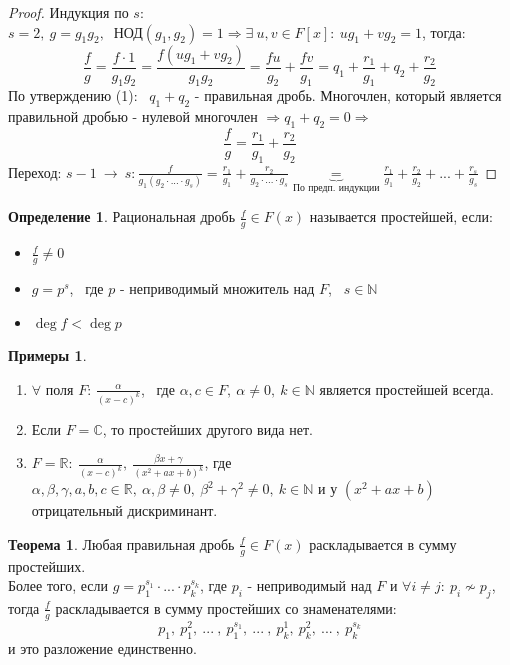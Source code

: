 \documentclass[a4paper, 12pt]{article}
\newcommand{\R}{\mathbb R}
\newcommand{\N}{\mathbb N}
\newcommand\tab[1][.5cm]{\hspace*{#1}}
\theoremstyle{definition}
\newtheorem*{definition}{Определение}
\newtheorem*{theorem}{Теорема}
\newtheorem*{example}{Примеры}
\begin{document}
  \begin{proof}
    Индукция по $s$:\\
    $s=2, \ g = g_1g_2, \ $ НОД$(g_1, g_2)=1 \Longrightarrow \exists \ u, v \in F[x]: \ ug_1 + vg_2 = 1$, тогда:
    $$\frac{f}{g} = \frac{f\cdot 1}{g_1g_2} = \frac{f(ug_1 + vg_2)}{g_1g_2} = \frac{fu}{g_2} + \frac{fv}{g_1} = q_1 + \frac{r_1}{g_1} + q_2 + \frac{r_2}{g_2}$$
    По утверждению (1): \ $q_1 + q_2$ - правильная дробь. Многочлен, который является правильной дробью - нулевой многочлен  $\Longrightarrow q_1 + q_2 = 0 \Longrightarrow$ 
    $$\frac{f}{g} =\frac{r_1}{g_1} + \frac{r_2}{g_2}$$
    Переход: $s-1 \ \to \ s: \frac{f}{g_1(g_2\cdot ... \cdot g_s)} = \frac{r_1}{g_1} + \frac{r_2}{g_2\cdot ... \cdot g_s} \underbrace{=}_{\text{По предп. индукции}} \frac{r_1}{g_1} + \frac{r_2}{g_2} + ... + \frac{r_s}{g_s}$
  \end{proof}
  \begin{definition}
    Рациональная дробь $\frac{f}{g}\in F(x)$ называется простейшей, если:
    \begin{itemize}
      \item[1) \ ] $\frac{f}{g} \neq 0$
      \item[2) \ ] $g = p^s$, \ где $p$ - неприводимый множитель над $F$, \ $s \in \N$
      \item[3) \ ] $\deg f < \deg p$ 
    \end{itemize}
  \end{definition}
  \begin{example}\tab
    \begin{enumerate}
      \item $\forall$ поля $F$: $\frac{\alpha}{(x-c)^k}$, \ где $\alpha, c \in F, \ \alpha\neq 0, \ k \in \N$ является простейшей всегда.
      \item Если $F = \mathbb{C}$, то простейших другого вида нет.
      \item $F = \R: \ \frac{\alpha}{(x-c)^k}, \ \frac{\beta x + \gamma}{(x^2+ax+b)^k}$, где $\alpha, \beta, \gamma, a, b, c \in \R, \ \alpha, \beta \neq 0, \ \beta^2 + \gamma^2\neq 0, \ k \in \N$ и у $(x^2+ax+b)$ отрицательный дискриминант.   
    \end{enumerate}
  \end{example}
  \begin{theorem}
    Любая правильная дробь $\frac{f}{g} \in F(x)$ раскладывается в сумму простейших.\\
    Более того, если $g = p_1^{s_1}\cdot ... \cdot p_k^{s_k}$, где $p_i$ - неприводимый над $F$ и $\forall i \neq j: \ p_i \not \sim p_j$, тогда $\frac{f}{g}$ раскладывается в сумму простейших со знаменателями: $$p_1, \  p_1^2, \ ... \ , \ p_1^{s_1}, \ ... \ , \ p_k^1, \ p_k^2, \ ... \ , \ p_k^{s_k}$$
    и это разложение единственно.       
  \end{theorem}
\end{document}
